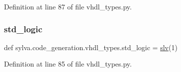 Definition at line 87 of file vhdl\+\_\+types.\+py.

\mbox{\label{namespacesylva_1_1code__generation_1_1vhdl__types_a845f43d0f072fe58cc3fbb8a1028cb2e}} 
\subsubsection{\texorpdfstring{std\+\_\+logic}{std\_logic}}
{\footnotesize\ttfamily def sylva.\+code\+\_\+generation.\+vhdl\+\_\+types.\+std\+\_\+logic = \hyperlink{namespacesylva_1_1code__generation_1_1vhdl__types_a8502d9eb6526007840a5e33d37826a0b}{slv}(1)}



Definition at line 85 of file vhdl\+\_\+types.\+py.

